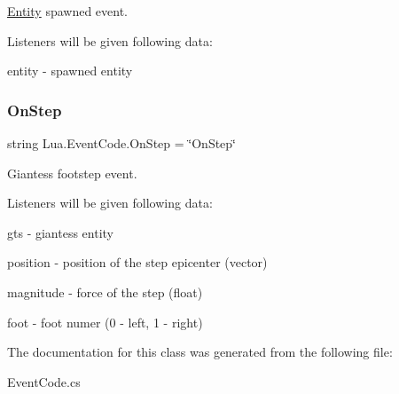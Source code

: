 \hyperlink{class_lua_1_1_entity}{Entity} spawned event. 

Listeners will be given following data\+:
\begin{DoxyItemize}
\item {\ttfamily entity} -\/ spawned entity 
\end{DoxyItemize}\mbox{\label{class_lua_1_1_event_code_adba8e0cdbec45f5694b0be4ea1fbfe7a}} 
\subsubsection{\texorpdfstring{On\+Step}{OnStep}}
{\footnotesize\ttfamily string Lua.\+Event\+Code.\+On\+Step = \char`\"{}On\+Step\char`\"{}\hspace{0.3cm}{\ttfamily [static]}}



Giantess footstep event. 

Listeners will be given following data\+:
\begin{DoxyItemize}
\item {\ttfamily gts} -\/ giantess entity
\item {\ttfamily position} -\/ position of the step epicenter (vector)
\item {\ttfamily magnitude} -\/ force of the step (float)
\item {\ttfamily foot} -\/ foot numer (0 -\/ left, 1 -\/ right) 
\end{DoxyItemize}

The documentation for this class was generated from the following file\+:\begin{DoxyCompactItemize}
\item 
Event\+Code.\+cs\end{DoxyCompactItemize}

